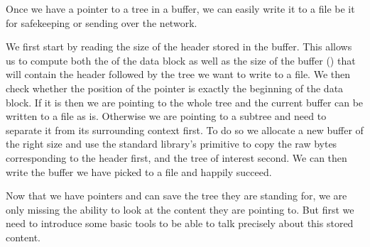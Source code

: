 Once we have a pointer to a tree in a buffer, we can easily write it to a
file be it for safekeeping or sending over the network.


We first start by reading the size of the header stored in the buffer.
%
This allows us to compute both the  of the data block
as well as the size of the buffer () that will
contain the header followed by the tree we want to write to a file.
%
We then check whether the position of the pointer is exactly the beginning
of the data block.
%
If it is then we are pointing to the whole tree and the current buffer can
be written to a file as is.
%
Otherwise we are pointing to a subtree and need to separate it from its
surrounding context first.
%
To do so we allocate a new buffer of the right size and use the
standard library's  primitive to copy the raw bytes
corresponding to the header first, and the tree of interest second.
%
We can then write the buffer we have picked to a file and happily succeed.



Now that we have pointers and can save the tree they are standing for,
we are only missing the ability to look at the content they are pointing to.
%
But first we need to introduce some basic tools
to be able to talk precisely about this stored content.
